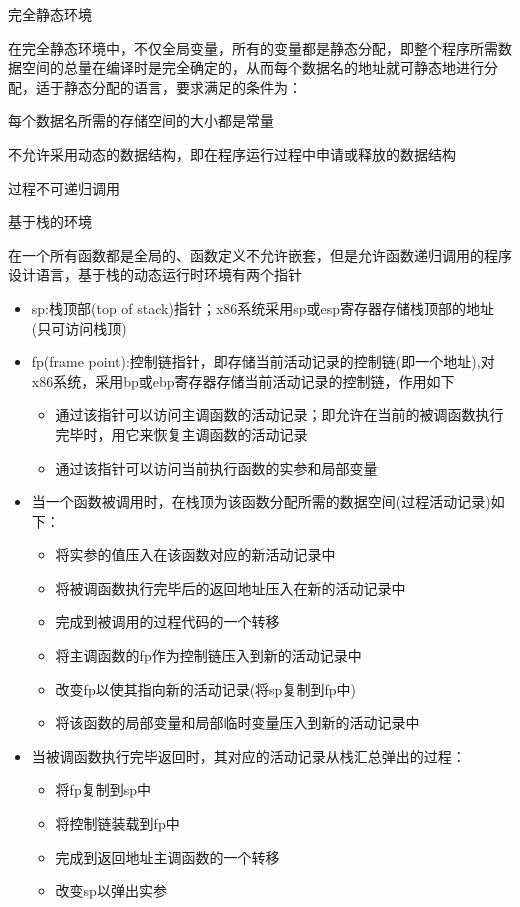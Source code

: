 \documentclass[utf8]{ctexart}
\begin{document}
\noindent 完全静态环境

在完全静态环境中，不仅全局变量，所有的变量都是静态分配，即整个程序所需数据空间的总量在编译时是完全确定的，从而每个数据名的地址就可静态地进行分配，适于静态分配的语言，要求满足的条件为：

每个数据名所需的存储空间的大小都是常量

不允许采用动态的数据结构，即在程序运行过程中申请或释放的数据结构

过程不可递归调用

基于栈的环境

在一个所有函数都是全局的、函数定义不允许嵌套，但是允许函数递归调用的程序设计语言，基于栈的动态运行时环境有两个指针

\begin{itemize}
    \item sp:栈顶部(top of stack)指针；x86系统采用sp或esp寄存器存储栈顶部的地址(只可访问栈顶)
    \item fp(frame point):控制链指针，即存储当前活动记录的控制链(即一个地址),对x86系统，采用bp或ebp寄存器存储当前活动记录的控制链，作用如下
    \begin{itemize}
        \item 通过该指针可以访问主调函数的活动记录；即允许在当前的被调函数执行完毕时，用它来恢复主调函数的活动记录
        \item 通过该指针可以访问当前执行函数的实参和局部变量
    \end{itemize}

    \item 当一个函数被调用时，在栈顶为该函数分配所需的数据空间(过程活动记录)如下：
    \begin{itemize}
        \item 将实参的值压入在该函数对应的新活动记录中
        \item 将被调函数执行完毕后的返回地址压入在新的活动记录中
        \item 完成到被调用的过程代码的一个转移
        \item 将主调函数的fp作为控制链压入到新的活动记录中
        \item 改变fp以使其指向新的活动记录(将sp复制到fp中)
        \item 将该函数的局部变量和局部临时变量压入到新的活动记录中
    \end{itemize}
    \item 当被调函数执行完毕返回时，其对应的活动记录从栈汇总弹出的过程：
    \begin{itemize}
        \item 将fp复制到sp中
        \item 将控制链装载到fp中
        \item 完成到返回地址主调函数的一个转移
        \item 改变sp以弹出实参
    \end{itemize}
\end{itemize}
\end{document}
